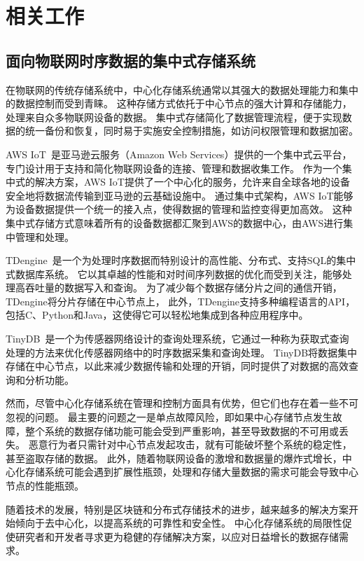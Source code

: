 \cleardoublepage
\chapter{相关工作}

\section{面向物联网时序数据的集中式存储系统}
在物联网的传统存储系统中，中心化存储系统通常以其强大的数据处理能力和集中的数据控制而受到青睐。
这种存储方式依托于中心节点的强大计算和存储能力，处理来自众多物联网设备的数据。
集中式存储简化了数据管理流程，便于实现数据的统一备份和恢复，同时易于实施安全控制措施，如访问权限管理和数据加密。

AWS IoT~\cite{aws}是亚马逊云服务（Amazon Web Services）提供的一个集中式云平台，专门设计用于支持和简化物联网设备的连接、管理和数据收集工作。
作为一个集中式的解决方案，AWS IoT提供了一个中心化的服务，允许来自全球各地的设备安全地将数据流传输到亚马逊的云基础设施中。
通过集中式架构，AWS IoT能够为设备数据提供一个统一的接入点，使得数据的管理和监控变得更加高效。
这种集中式存储方式意味着所有的设备数据都汇聚到AWS的数据中心，由AWS进行集中管理和处理。

TDengine~\cite{tdengine}是一个为处理时序数据而特别设计的高性能、分布式、支持SQL的集中式数据库系统。
它以其卓越的性能和对时间序列数据的优化而受到关注，能够处理高吞吐量的数据写入和查询。
为了减少每个数据存储分片之间的通信开销，TDengine将分片存储在中心节点上，
此外，TDengine支持多种编程语言的API，包括C、Python和Java，这使得它可以轻松地集成到各种应用程序中。

TinyDB~\cite{madden2005tinydb}是一个为传感器网络设计的查询处理系统，它通过一种称为获取式查询处理的方法来优化传感器网络中的时序数据采集和查询处理。
TinyDB将数据集中存储在中心节点，以此来减少数据传输和处理的开销，同时提供了对数据的高效查询和分析功能。

然而，尽管中心化存储系统在管理和控制方面具有优势，但它们也存在着一些不可忽视的问题。
最主要的问题之一是单点故障风险，即如果中心存储节点发生故障，整个系统的数据存储功能可能会受到严重影响，甚至导致数据的不可用或丢失。
恶意行为者只需针对中心节点发起攻击，就有可能破坏整个系统的稳定性，甚至盗取存储的数据。
此外，随着物联网设备的激增和数据量的爆炸式增长，中心化存储系统可能会遇到扩展性瓶颈，处理和存储大量数据的需求可能会导致中心节点的性能瓶颈。

随着技术的发展，特别是区块链和分布式存储技术的进步，越来越多的解决方案开始倾向于去中心化，以提高系统的可靠性和安全性。
中心化存储系统的局限性促使研究者和开发者寻求更为稳健的存储解决方案，以应对日益增长的数据存储需求。

